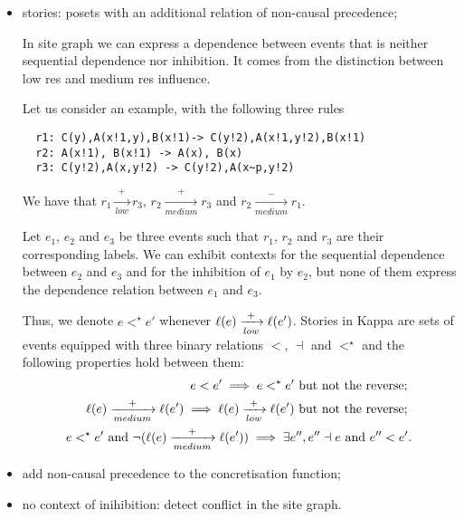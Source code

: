 \begin{mdframed}[backgroundcolor=blue!20]
  \begin{itemize}
  \item stories: posets with an additional relation of non-causal precedence;
\begin{remark}
In site graph we can express a dependence between events that is neither sequential dependence nor inhibition. It comes from the distinction between low res and medium res influence.

Let us consider an example, with the following three rules

\begin{verbatim}
  r1: C(y),A(x!1,y),B(x!1)-> C(y!2),A(x!1,y!2),B(x!1)
  r2: A(x!1), B(x!1) -> A(x), B(x)
  r3: C(y!2),A(x,y!2) -> C(y!2),A(x~p,y!2)
\end{verbatim}

We have that $r_1\xrightarrow[low]{+} r_3$, $r_2\xrightarrow[medium]{+} r_3$ and $r_2\xrightarrow[medium]{-} r_1$.

Let $e_1$, $e_2$ and $e_3$ be three events such that $r_1$, $r_2$ and $r_3$ are their corresponding labels. We can exhibit contexts for the sequential dependence between $e_2$ and $e_3$ and for the inhibition of $e_1$ by $e_2$, but none of them express the dependence relation between $e_1$ and $e_3$.

Thus, we denote $e<^{\star}e'$ whenever $\ell(e)\xrightarrow[low]{+} \ell(e')$. Stories in Kappa are sets of events equipped with three binary relations $<$, $\dashv$ and $<^{\star}$ and the following properties hold between them:
\begin{align*}
  e < e' \implies e<^{\star}e'\text{ but not the reverse; }\\
\ell(e)\xrightarrow[medium]{+} \ell(e') \implies \ell(e)\xrightarrow[low]{+} \ell(e')\text{ but not the reverse; }\\
  e<^{\star}e'\text{ and }\neg(\ell(e)\xrightarrow[medium]{+} \ell(e'))\implies \exists e'', e''\dashv e\text{ and }e''< e'.
\end{align*}
\end{remark}

  \item add non-causal precedence to the concretisation function;
  \item no context of inihibition: detect conflict in the site graph.
  \end{itemize}
\end{mdframed}
